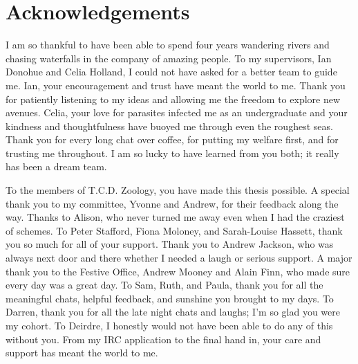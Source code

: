 \chapter*{Acknowledgements}  

{\small I am so thankful to have been able to spend four years wandering rivers and chasing waterfalls in the company of amazing people. To my supervisors, Ian Donohue and Celia Holland, I could not have asked for a better team to guide me. Ian, your encouragement and trust have meant the world to me. Thank you for patiently listening to my ideas and allowing me the freedom to explore new avenues. Celia, your love for parasites infected me as an undergraduate and your kindness and thoughtfulness have buoyed me through even the roughest seas. Thank you for every long chat over coffee, for putting my welfare first, and for trusting me throughout. I am so lucky to have learned from you both; it really has been a dream team.}

{\small To the members of T.C.D. Zoology, you have made this thesis possible.  A special thank you to my committee, Yvonne and Andrew, for their feedback along the way. Thanks to Alison, who never turned me away even when I had the craziest of schemes. To Peter Stafford, Fiona Moloney, and Sarah-Louise Hassett, thank you so much for all of your support. Thank you to Andrew Jackson, who was always next door and there whether I needed a laugh or serious support. A major thank you to the Festive Office, Andrew Mooney and Alain Finn, who made sure every day was a great day. To Sam, Ruth, and Paula, thank you for all the meaningful chats, helpful feedback, and sunshine you brought to my days. To Darren, thank you for all the late night chats and laughs; I'm so glad you were my cohort. To Deirdre, I honestly would not have been able to do any of this without you. From my IRC application to the final hand in, your care and support has meant the world to me.}

